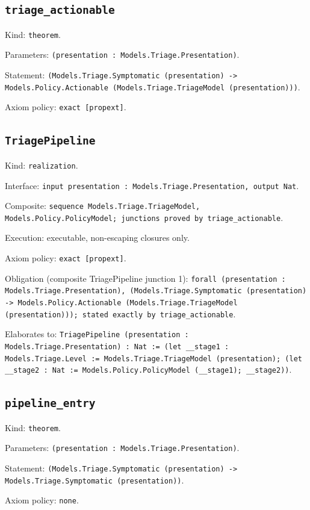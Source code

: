 \documentclass[11pt]{article}
\begin{document}
\subsection*{\texttt{triage\_actionable}}
\noindent Kind: \texttt{theorem}.\par
\noindent Parameters: \texttt{(presentation : Models.Triage.Presentation)}.\par
\noindent Statement: \texttt{(Models.Triage.Symptomatic (presentation) -> Models.Policy.Actionable (Models.Triage.TriageModel (presentation)))}.\par
\noindent Axiom policy: \texttt{exact [propext]}.\par
\subsection*{\texttt{TriagePipeline}}
\noindent Kind: \texttt{realization}.\par
\noindent Interface: \texttt{input presentation : Models.Triage.Presentation, output Nat}.\par
\noindent Composite: \texttt{sequence Models.Triage.TriageModel, Models.Policy.PolicyModel; junctions proved by triage\_actionable}.\par
\noindent Execution: executable, non-escaping closures only.\par
\noindent Axiom policy: \texttt{exact [propext]}.\par
\noindent Obligation (composite TriagePipeline junction 1): \texttt{forall (presentation : Models.Triage.Presentation), (Models.Triage.Symptomatic (presentation) -> Models.Policy.Actionable (Models.Triage.TriageModel (presentation))); stated exactly by triage\_actionable}.\par
\noindent Elaborates to: \texttt{TriagePipeline (presentation : Models.Triage.Presentation) : Nat := (let \_\_stage1 : Models.Triage.Level := Models.Triage.TriageModel (presentation); (let \_\_stage2 : Nat := Models.Policy.PolicyModel (\_\_stage1); \_\_stage2))}.\par
\subsection*{\texttt{pipeline\_entry}}
\noindent Kind: \texttt{theorem}.\par
\noindent Parameters: \texttt{(presentation : Models.Triage.Presentation)}.\par
\noindent Statement: \texttt{(Models.Triage.Symptomatic (presentation) -> Models.Triage.Symptomatic (presentation))}.\par
\noindent Axiom policy: \texttt{none}.\par
\end{document}
